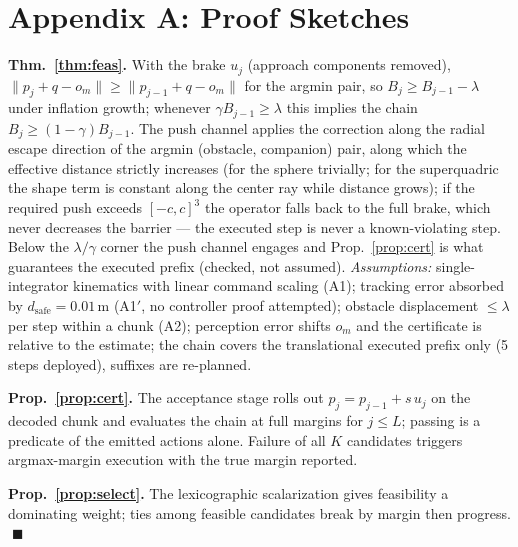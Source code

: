 \documentclass[conference]{IEEEtran}
\begin{document}
\appendix
\section*{Appendix A: Proof Sketches}
\textbf{Thm.~\ref{thm:feas}.} With the brake $u_j$ (approach components removed), $\lVert p_j+q-o_m\rVert\ge\lVert p_{j-1}+q-o_m\rVert$ for the argmin pair, so $B_j\ge B_{j-1}-\lambda$ under inflation growth; whenever $\gamma B_{j-1}\ge\lambda$ this implies the chain $B_j\ge(1-\gamma)B_{j-1}$. The push channel applies the correction along the radial escape direction of the argmin (obstacle, companion) pair, along which the effective distance strictly increases (for the sphere trivially; for the superquadric the shape term is constant along the center ray while distance grows); if the required push exceeds $[-c,c]^3$ the operator falls back to the full brake, which never decreases the barrier --- the executed step is never a known-violating step. Below the $\lambda/\gamma$ corner the push channel engages and Prop.~\ref{prop:cert} is what guarantees the executed prefix (checked, not assumed). \emph{Assumptions:} single-integrator kinematics with linear command scaling (A1); tracking error absorbed by $d_{\mathrm{safe}}=0.01$\,m (A1$'$, no controller proof attempted); obstacle displacement $\le\lambda$ per step within a chunk (A2); perception error shifts $o_m$ and the certificate is relative to the estimate; the chain covers the translational executed prefix only (5 steps deployed), suffixes are re-planned.

\textbf{Prop.~\ref{prop:cert}.} The acceptance stage rolls out $p_j=p_{j-1}+s\,u_j$ on the decoded chunk and evaluates the chain at full margins for $j\le L$; passing is a predicate of the emitted actions alone. Failure of all $K$ candidates triggers argmax-margin execution with the true margin reported.

\textbf{Prop.~\ref{prop:select}.} The lexicographic scalarization gives feasibility a dominating weight; ties among feasible candidates break by margin then progress. $\;\blacksquare$
\end{document}
